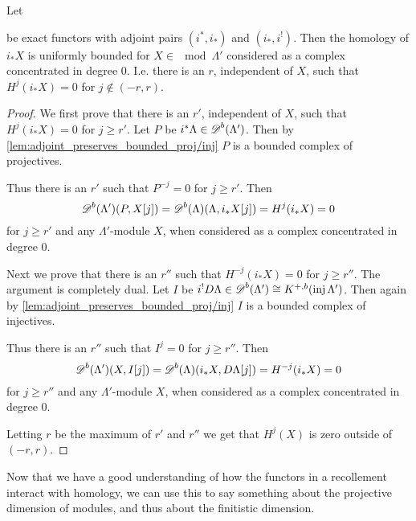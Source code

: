 \begin{lemma} \label{lem:uniform_bound_on_homology}
	Let  be exact functors with adjoint pairs $(i^*,i_*)$ and $(i_*, i^!)$. Then the homology of $i_*X$ is uniformly bounded for $X\in\mod\Lambda'$ considered as a complex concentrated in degree 0. I.e. there is an $r$, independent of $X$, such that $H^{j}(i_*X) = 0$ for $j\not\in(-r, r)$.
	\begin{proof}
		We first prove that there is an $r'$, independent of $X$, such that $H^{j}(i_*X)=0$ for $j \geq r'$.
		Let $P$ be $i^*\Lambda \in \operatorname{\mathscr{D}}^b(\Lambda')$. Then by \cref{lem:adjoint_preserves_bounded_proj/inj} $P$ is a bounded complex of projectives.
		
		Thus there is an $r'$ such that $P^{-j}=0$ for $j \geq r'$. Then $$\operatorname{\mathscr{D}}^b(\Lambda')(P, X[j]) = \operatorname{\mathscr{D}}^b(\Lambda)(\Lambda, i_*X[j]) = H^{j}(i_*X)=0$$ for $j\geq r'$ and any $\Lambda'$-module $X$, when considered as a complex concentrated in degree 0.
		
		Next we prove that there is an $r''$ such that $H^{-j}(i_*X)=0$ for $j \geq r''$. The argument is completely dual. Let $I$ be $i^!D\Lambda \in \operatorname{\mathscr{D}}^b(\Lambda') \cong K^{+,b}(\operatorname{inj}\Lambda')$. Then again by \cref{lem:adjoint_preserves_bounded_proj/inj} $I$ is a bounded complex of injectives.
		
		Thus there is an $r''$ such that $I^{j}=0$ for $j \geq r''$. Then $$\operatorname{\mathscr{D}}^b(\Lambda')(X, I[j]) = \operatorname{\mathscr{D}}^b(\Lambda)(i_*X, D\Lambda[j]) = H^{-j}(i_*X)=0$$ for $j\geq r''$ and any $\Lambda'$-module $X$, when considered as a complex concentrated in degree 0.
		
		Letting $r$ be the maximum of $r'$ and $r''$ we get that $H^{j}(X)$ is zero outside of $(-r, r)$.
	\end{proof}
\end{lemma}

Now that we have a good understanding of how the functors in a recollement interact with homology, we can use this to say something about the projective dimension of modules, and thus about the finitistic dimension.


